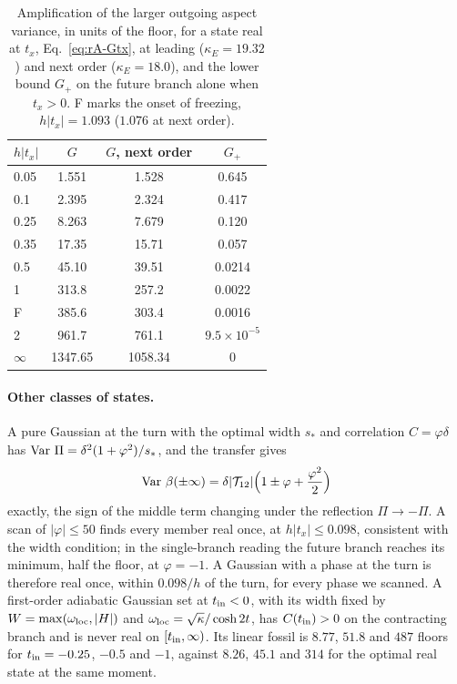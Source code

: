 \begin{table}[tbp]
\centering
\caption{Amplification of the larger outgoing aspect variance, in units of the floor, for a state real at $t_x$, Eq.~\eqref{eq:rA-Gtx}, at leading ($\kappa_E=19.32$) and next order ($\kappa_E=18.0$), and the lower bound $G_+$ on the future branch alone when $t_x>0$. F marks the onset of freezing, $h|t_x|=1.093$ ($1.076$ at next order).}
\label{tab:rA-G}
\begin{tabular}{lccc}
\toprule
$h|t_x|$ & $G$ & $G$, next order & $G_+$\\
\midrule
0.05 & 1.551 & 1.528 & 0.645\\ %
0.1 & 2.395 & 2.324 & 0.417\\ %
0.25 & 8.263 & 7.679 & 0.120\\ %
0.35 & 17.35 & 15.71 & 0.057\\ %
0.5 & 45.10 & 39.51 & 0.0214\\ %
1 & 313.8 & 257.2 & 0.0022\\ %
F & 385.6 & 303.4 & 0.0016\\ %
2 & 961.7 & 761.1 & $9.5\times10^{-5}$\\ %
$\infty$ & 1347.65 & 1058.34 & 0\\ %
\bottomrule
\end{tabular}
\end{table}

\paragraph{Other classes of states.}
A pure Gaussian at the turn with the optimal width $s_*$ and correlation $C=\varphi\delta$ has $\operatorname{Var}\,\Pi=\delta^2(1+\varphi^2)/s_*$, and the transfer gives
\begin{equation}
\operatorname{Var}\,\beta(\pm\infty)=\delta|\mathcal{T}_{12}|\Big(1\pm\varphi+\frac{\varphi^2}2\Big)
\end{equation}
exactly, the sign of the middle term changing under the reflection $\Pi\to-\Pi$.
A scan of $|\varphi|\leq50$ finds every member real once, at $h|t_x|\leq0.098$, consistent with the width condition; in the single-branch reading the future branch reaches its minimum, half the floor, at $\varphi=-1$. %
A Gaussian with a phase at the turn is therefore real once, within $0.098/h$ of the turn, for every phase we scanned. %
A first-order adiabatic Gaussian set at $t_{\rm in}<0$, with its width fixed by $W=\max(\omega_{\rm loc},|H|)$ and $\omega_{\rm loc}=\sqrt{\kappa}/\cosh2t$, has $C(t_{\rm in})>0$ on the contracting branch and is never real on $[t_{\rm in},\infty)$.
Its linear fossil is $8.77$, $51.8$ and $487$ floors for $t_{\rm in}=-0.25$, $-0.5$ and $-1$, against $8.26$, $45.1$ and $314$ for the optimal real state at the same moment. %


